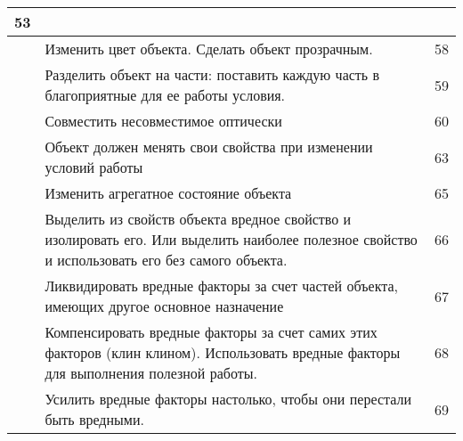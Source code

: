 \documentclass[11pt,a4paper]{article}
\begin{document}
\begin{center}
\begin{tabular}{|p{}|p{}|p{}|}
53\\\hline
&Изменить цвет объекта. Сделать объект прозрачным. & 58\\\hline
&Разделить объект на части: поставить каждую часть в благоприятные для ее
работы условия. & 59\\\hline
&Совместить несовместимое оптически & 60\\\hline
&Объект должен менять свои свойства при изменении условий работы & 63\\\hline
&Изменить агрегатное состояние объекта & 65\\\hline
&Выделить из свойств объекта вредное свойство и изолировать его. Или выделить
наиболее полезное свойство и использовать его без самого объекта. & 66\\\hline
&Ликвидировать вредные факторы за счет частей объекта, имеющих другое основное
назначение & 67\\\hline
&Компенсировать вредные факторы за счет самих этих факторов (клин клином).
Использовать вредные факторы для выполнения полезной работы. & 68\\\hline
&Усилить вредные факторы настолько, чтобы они перестали быть вредными. &
69\\\hline
  \end{tabular}
\end{center}
\end{document}
